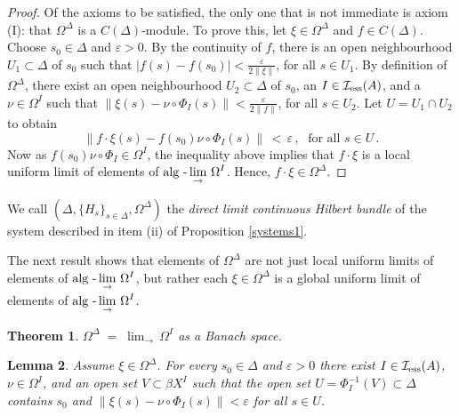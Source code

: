 \documentclass{amsart}
\newtheorem{theorem}{Theorem}[section]
\newtheorem{lemma}[theorem]{Lemma}
\theoremstyle{definition}
\theoremstyle{remark}
\begin{document}
\begin{proof} Of the axioms to be satisfied, the only one that is not immediate
is axiom (I): that $\Omega^\Delta$ is a $C(\Delta)$-module. To prove this, let $\xi\in\Omega^\Delta$
and $f\in C(\Delta)$. Choose $s_0\in \Delta$ and $\varepsilon>0$. By the continuity of $f$, there is
an open neighbourhood $U_1\subset\Delta$ of $s_0$ such that $|f(s)-f(s_0)|<\frac{\varepsilon}{2\|\xi\|}$,
for all $s\in U_1$. By definition of $\Omega^\Delta$, there exist an open neighbourhood $U_2\subset \Delta$ of $s_0$,
an $I\in \mathcal I_{\rm ess}(A)$, and a $\nu\in\Omega^I$
such that $\|\xi(s)-\nu\circ\Phi_I(s)\|<\frac{\varepsilon}{2 \|f\| }$, for all $s\in U_2$. Let $U=U_1\cap U_2$ to obtain
\[
\|f\cdot\xi(s)-f(s_0)\nu\circ\Phi_I(s)\|\,<\,\varepsilon\,,\;\mbox{ for all }s\in U\,.
\]
Now as $f(s_0)\nu\circ\Phi_I\in\Omega^I$, the inequality above implies that $f\cdot \xi $ is a local uniform limit of
elements of $\displaystyle\mbox{\rm alg -}\lim_{\rightarrow}\,\Omega^I$. Hence, $f\cdot\xi\in\Omega^\Delta$.
\end{proof}

We call $(\Delta, \{H_s\}_{s\in\Delta}, \Omega^\Delta)$ the
\emph{direct limit continuous Hilbert bundle} of the system described in item (ii) of Proposition \ref{systems1}.

The next result shows that elements  of $\Omega^\Delta$ are not just local uniform limits of elements of
$\displaystyle\mbox{\rm alg -}\lim_{\rightarrow}\,\Omega^I$, but rather
each $\xi\in\Omega^\Delta$ is a {global} uniform limit of elements of
$\displaystyle\mbox{\rm alg -}\lim_{\rightarrow}\,\Omega^I$.

\begin{theorem}\label{omega limit}  $\Omega^\Delta\;=\;\displaystyle\lim_{\rightarrow}\,\Omega^I$
as a Banach space.
\end{theorem}

\begin{lemma}\label{name} Assume $\xi\in\Omega^\Delta$.
For every $s_0\in\Delta$ and $\varepsilon>0$ there exist $I\in \mathcal I_{\rm ess}(A)$,
$\nu\in\Omega^I$, and an open set $V\subset\beta X^I$ such that the open set $U=\Phi_I^{-1}(V)\subset\Delta$
contains $s_0$ and $\|\xi(s)-\nu\circ\Phi_I(s)\|<\varepsilon$ for all $s\in U$.
\end{lemma}
\end{document}
